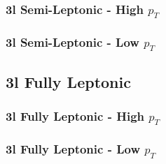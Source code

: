 \subsubsection{3l Semi-Leptonic - High $p_T$}
\label{sec:3lSHigh}

\subsubsection{3l Semi-Leptonic - Low $p_T$}
\label{sec:3lSLow}

\subsection{3l Fully Leptonic}
\label{sec:3lFSigBkg}

\subsubsection{3l Fully Leptonic - High $p_T$}
\label{sec:3lFHigh}

\subsubsection{3l Fully Leptonic - Low $p_T$}
\label{sec:3lFLow}



